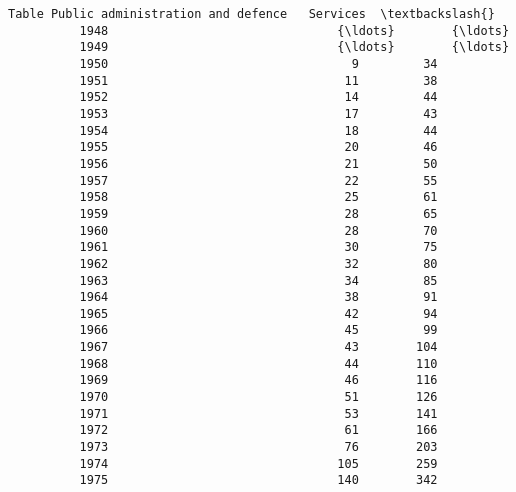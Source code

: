 \documentclass[11pt]{article}
\begin{document}
\begin{Verbatim}[commandchars=\\\{\}]
          Table Public administration and defence   Services  \textbackslash{}
          1948                                {\ldots}        {\ldots}   
          1949                                {\ldots}        {\ldots}   
          1950                                  9         34   
          1951                                 11         38   
          1952                                 14         44   
          1953                                 17         43   
          1954                                 18         44   
          1955                                 20         46   
          1956                                 21         50   
          1957                                 22         55   
          1958                                 25         61   
          1959                                 28         65   
          1960                                 28         70   
          1961                                 30         75   
          1962                                 32         80   
          1963                                 34         85   
          1964                                 38         91   
          1965                                 42         94   
          1966                                 45         99   
          1967                                 43        104   
          1968                                 44        110   
          1969                                 46        116   
          1970                                 51        126   
          1971                                 53        141   
          1972                                 61        166   
          1973                                 76        203   
          1974                                105        259   
          1975                                140        342   
          

\end{Verbatim}
\end{document}
